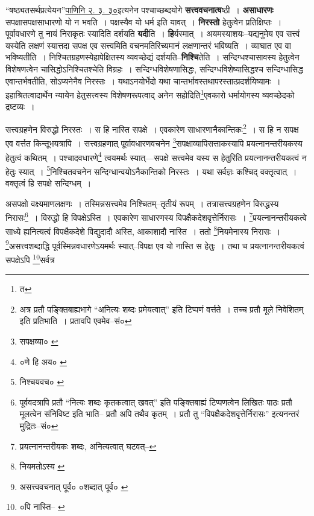 \documentclass[article,12pt,a4paper]{memoir}
\begin{document}
	  \pstart “षष्ठ्यतसर्थप्रत्येयन”\href{http://http://sarit.indology.info/?cref=Pā.2.3.30}{पाणिनि २. ३. ३०}इत्यनेन पश्चाच्छब्दयोगे \textbf{सत्त्ववचनात्ष}ष्ठी । \textbf{असाधारणः} सपक्षासपक्षसाधारणो यो न भवति । पक्षस्यैव यो धर्म इति यावत् । \textbf{निरस्तो} हेतुत्वेन प्रतिक्षिप्तः । पूर्वावधारणे तु नायं निराकृतः स्यादिति दर्शयति \textbf{यदी}ति । \textbf{हि}र्यस्मात् । अयमस्याशयः--यद्यनुमेय एव सत्त्वं यस्येति लक्षणं स्यात्तदा सपक्ष एव सत्त्वमिति वचनमतिरिच्यमानं लक्षणान्तरं भविष्यति । व्याघात एव वा भविष्यतीति । निश्चितग्रहणस्येहापेक्षितस्य व्यवच्छेद्यं दर्शयति--\textbf{निश्चि}तेति । सन्दिग्धश्चासावस्य हेतुत्वेन विशेषणत्वेन चासिद्धोऽनिश्चितश्चेति विग्रहः । सन्दिग्धविशेषणासिद्धः, सन्दिग्धविशेष्यासिद्धश्च सन्दिग्धासिद्ध एवान्त\leavevmode{}र्भवतीति, सोऽप्यनेनैव निरस्तः । यथाऽनयोर्भेदो यथा चान्तर्भावस्तथापरस्तात्प्रदर्शयिष्यामः । इहाश्रितत्वादार्थेन न्यायेन हेतुसत्त्वस्य विशेषणरूपत्वाद् अनेन सहोदिति\footnote{त}एवकारो धर्मायोगस्य व्यवच्छेदको द्रष्टव्यः ।
	\pend
      \leavevmode{}
	  \bigskip
	  \begingroup
	

	  \pstart सत्त्वग्रहणेन विरुद्धो निरस्तः । स हि नास्ति सपक्षे । एवकारेण साधारणानैकान्तिकः\footnote{अत्र \cite{dp-msD} प्रतौ पङ्क्तिबाह्यभागे “अनित्यः शब्दः प्रमेयत्वात्” इति टिप्पणं वर्त्तते । तच्च \cite{dp-msB} प्रतौ मूले निवेशितम् इति प्रतिभाति । \cite{dp-edH} \cite{dp-edN} प्रतावपि एवमेव--सं०} । स हि न सपक्ष एव वर्त्तत किन्तूभयत्रापि । सत्त्वग्रहणात् पूर्वावधारणवचनेन \footnote{सपक्षव्या० \cite{dp-msB} \cite{dp-edH}}सपक्षाव्यापिसत्ताकस्यापि प्रयत्नानन्तरीयकस्य हेतुत्वं कथितम् । पश्चादवधारणे\footnote{०णे हि अय० \cite{dp-msA} \cite{dp-msC}} त्वयमर्थः स्यात्—सपक्षे सत्त्वमेव यस्य स हेतुरिति प्रयत्नानन्तरीयकत्वं न हेतुः स्यात् । \footnote{निश्चयवच० \cite{dp-msA}}निश्चितवचनेन सन्दिग्धान्वयोऽनैकान्तिको निरस्तः । यथा सर्वज्ञः कश्चिद् वक्तृत्वात् । वक्तृत्वं हि सपक्षे सन्दिग्धम् ।
	\pend
       

	  \pstart असपक्षो वक्ष्यमाणलक्षणः । तस्मिन्नसत्त्वमेव निश्चितम्--तृतीयं रूपम् । तत्रासत्त्वग्रहणेन विरुद्धस्य निरासः\footnote{पूर्ववदत्रापि \cite{dp-msD} प्रतौ “नित्यः शब्दः कृतकत्वात् खवत्” इति पङ्क्तिबाह्यं टिप्पणत्वेन लिखितः पाठः \cite{dp-msB} प्रतौ मूलत्वेन संनिविष्ट इति भाति--\cite{dp-edN} प्रतौ अपि तथैव कृतम् । \cite{dp-edH} प्रतौ तु “विपक्षैकदेशवृत्तेर्निरासः” इत्यनन्तरं मुद्रितः--सं०} । विरुद्धो हि विपक्षेऽस्ति । एवकारेण साधारणस्य विपक्षैकदेशवृत्तेर्निरासः । \footnote{प्रयत्नानन्तरीयकः शब्दः, अनित्यत्वात् घटवत्--\cite{dp-msD-n}}प्रयत्नानन्तरीयकत्वे साध्ये ह्यनित्यत्वं विपक्षैकदेशे विद्युदादौ अस्ति, आकाशादौ नास्ति । ततो \footnote{नियमतोऽस्य \cite{dp-msC}}नियमेनास्य निरासः । \footnote{असत्त्ववचनात् पूर्व० \cite{dp-msA} \cite{dp-edP} \cite{dp-edH} \cite{dp-edE} \cite{dp-edN} ०शब्दात् पूर्व० \cite{dp-msB} \cite{dp-msC} \cite{dp-msD}}असत्त्वशब्दाद्धि पूर्वस्मिन्नवधारणेऽयमर्थः स्यात्--विपक्ष एव यो नास्ति स हेतुः । तथा च प्रयत्नानन्तरीयकत्वं सपक्षेऽपि \footnote{०पि नास्ति--\cite{dp-msB} \cite{dp-edE}}सर्वत्र
	\pend
      
\end{document}
